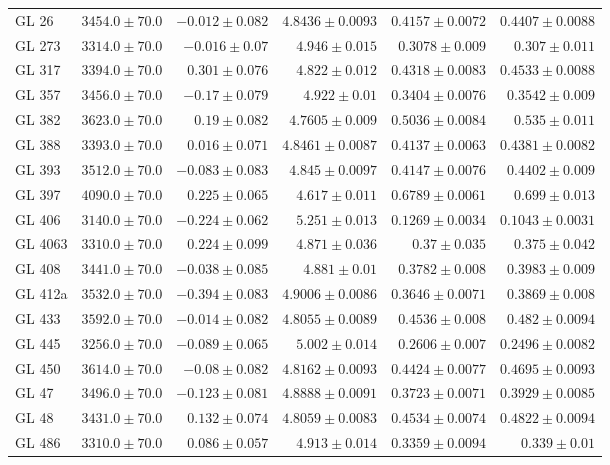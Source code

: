 \begin{longtable*}{lrrrrr}
GL 26 & $3454.0\pm 70.0$ & $-0.012\pm 0.082$ & $4.8436\pm 0.0093$ & $0.4157\pm 0.0072$ & $0.4407\pm 0.0088$ \\ 
GL 273 & $3314.0\pm 70.0$ & $-0.016\pm 0.07$ & $4.946\pm 0.015$ & $0.3078\pm 0.009$ & $0.307\pm 0.011$ \\ 
GL 317 & $3394.0\pm 70.0$ & $0.301\pm 0.076$ & $4.822\pm 0.012$ & $0.4318\pm 0.0083$ & $0.4533\pm 0.0088$ \\ 
GL 357 & $3456.0\pm 70.0$ & $-0.17\pm 0.079$ & $4.922\pm 0.01$ & $0.3404\pm 0.0076$ & $0.3542\pm 0.009$ \\ 
GL 382 & $3623.0\pm 70.0$ & $0.19\pm 0.082$ & $4.7605\pm 0.009$ & $0.5036\pm 0.0084$ & $0.535\pm 0.011$ \\ 
GL 388 & $3393.0\pm 70.0$ & $0.016\pm 0.071$ & $4.8461\pm 0.0087$ & $0.4137\pm 0.0063$ & $0.4381\pm 0.0082$ \\ 
GL 393 & $3512.0\pm 70.0$ & $-0.083\pm 0.083$ & $4.845\pm 0.0097$ & $0.4147\pm 0.0076$ & $0.4402\pm 0.009$ \\ 
GL 397 & $4090.0\pm 70.0$ & $0.225\pm 0.065$ & $4.617\pm 0.011$ & $0.6789\pm 0.0061$ & $0.699\pm 0.013$ \\ 
GL 406 & $3140.0\pm 70.0$ & $-0.224\pm 0.062$ & $5.251\pm 0.013$ & $0.1269\pm 0.0034$ & $0.1043\pm 0.0031$ \\ 
GL 4063 & $3310.0\pm 70.0$ & $0.224\pm 0.099$ & $4.871\pm 0.036$ & $0.37\pm 0.035$ & $0.375\pm 0.042$ \\ 
GL 408 & $3441.0\pm 70.0$ & $-0.038\pm 0.085$ & $4.881\pm 0.01$ & $0.3782\pm 0.008$ & $0.3983\pm 0.009$ \\ 
GL 412a & $3532.0\pm 70.0$ & $-0.394\pm 0.083$ & $4.9006\pm 0.0086$ & $0.3646\pm 0.0071$ & $0.3869\pm 0.008$ \\ 
GL 433 & $3592.0\pm 70.0$ & $-0.014\pm 0.082$ & $4.8055\pm 0.0089$ & $0.4536\pm 0.008$ & $0.482\pm 0.0094$ \\ 
GL 445 & $3256.0\pm 70.0$ & $-0.089\pm 0.065$ & $5.002\pm 0.014$ & $0.2606\pm 0.007$ & $0.2496\pm 0.0082$ \\ 
GL 450 & $3614.0\pm 70.0$ & $-0.08\pm 0.082$ & $4.8162\pm 0.0093$ & $0.4424\pm 0.0077$ & $0.4695\pm 0.0093$ \\ 
GL 47 & $3496.0\pm 70.0$ & $-0.123\pm 0.081$ & $4.8888\pm 0.0091$ & $0.3723\pm 0.0071$ & $0.3929\pm 0.0085$ \\ 
GL 48 & $3431.0\pm 70.0$ & $0.132\pm 0.074$ & $4.8059\pm 0.0083$ & $0.4534\pm 0.0074$ & $0.4822\pm 0.0094$ \\ 
GL 486 & $3310.0\pm 70.0$ & $0.086\pm 0.057$ & $4.913\pm 0.014$ & $0.3359\pm 0.0094$ & $0.339\pm 0.01$ \\ 

\end{longtable*}
